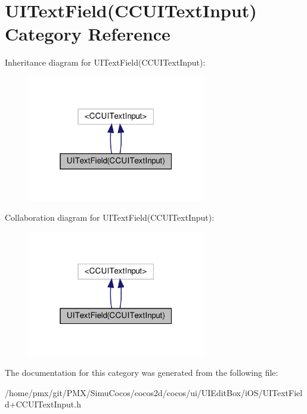 \hypertarget{categoryUITextField_07CCUITextInput_08}{}\section{U\+I\+Text\+Field(C\+C\+U\+I\+Text\+Input) Category Reference}
\label{categoryUITextField_07CCUITextInput_08}


Inheritance diagram for U\+I\+Text\+Field(C\+C\+U\+I\+Text\+Input)\+:
\nopagebreak
\begin{figure}[H]
\begin{center}
\leavevmode
\includegraphics[width=220pt]{categoryUITextField_07CCUITextInput_08__inherit__graph}
\end{center}
\end{figure}


Collaboration diagram for U\+I\+Text\+Field(C\+C\+U\+I\+Text\+Input)\+:
\nopagebreak
\begin{figure}[H]
\begin{center}
\leavevmode
\includegraphics[width=220pt]{categoryUITextField_07CCUITextInput_08__coll__graph}
\end{center}
\end{figure}


The documentation for this category was generated from the following file\+:\begin{DoxyCompactItemize}
\item 
/home/pmx/git/\+P\+M\+X/\+Simu\+Cocos/cocos2d/cocos/ui/\+U\+I\+Edit\+Box/i\+O\+S/U\+I\+Text\+Field+\+C\+C\+U\+I\+Text\+Input.\+h\end{DoxyCompactItemize}
